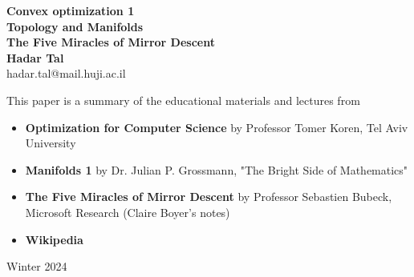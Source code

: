 \documentclass[11pt]{book} %
\begin{document}
\begin{titlepage}
    \begin{center}
     {\huge\bfseries 
     Convex optimization 1\\
     Topology and Manifolds \\
     The Five Miracles of Mirror Descent \\}
     \vspace{1.5cm}
     {\Large\bfseries Hadar Tal}\\[5pt]
     hadar.tal@mail.huji.ac.il\\[14pt]
     \vspace{2cm}
     {This paper is a summary of the educational materials and lectures from 
     \begin{itemize}
        \item \textbf{Optimization for Computer Science} by Professor Tomer Koren, Tel Aviv University
        \item \textbf{Manifolds 1} by Dr. Julian P. Grossmann, "The Bright Side of Mathematics" 
        \item \textbf{The Five Miracles of Mirror Descent} by Professor Sebastien Bubeck, Microsoft Research (Claire Boyer's notes)
        \item \textbf{Wikipedia}
     \end{itemize}
     }

     \vfill
    {Winter 2024}
    \end{center}
\end{titlepage}


\frontmatter
\tableofcontents

\end{document}
